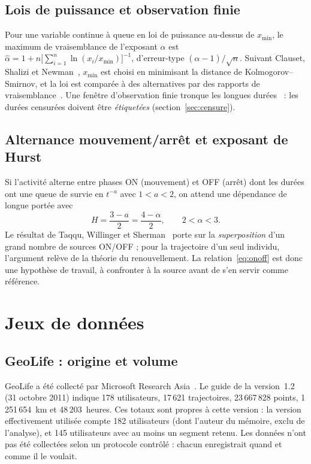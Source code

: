 \documentclass[12pt,a4paper]{report}
\theoremstyle{definition}
\begin{document}
\section{Lois de puissance et observation finie}

Pour une variable continue à queue en loi de puissance au-dessus de $x_{\min}$, le
maximum de vraisemblance de l'exposant $\alpha$ est
$\hat\alpha=1+n\bigl[\sum_{i=1}^n\ln(x_i/x_{\min})\bigr]^{-1}$, d'erreur-type
$(\hat\alpha-1)/\sqrt n$. Suivant Clauset, Shalizi et Newman~\cite{clauset2009}, $x_{\min}$
est choisi en minimisant la distance de Kolmogorov--Smirnov, et la loi est comparée à des
alternatives par des rapports de vraisemblance~\cite{vuong1989}. Une fenêtre d'observation
finie tronque les longues durées~\cite{kivela2015} : les durées censurées doivent être
\emph{étiquetées} (section~\ref{sec:censure}).

\section{Alternance mouvement/arrêt et exposant de Hurst}

Si l'activité alterne entre phases ON (mouvement) et OFF (arrêt) dont les durées ont une
queue de survie en $t^{-a}$ avec $1<a<2$, on attend une dépendance de longue portée avec
\begin{equation}
  H=\frac{3-a}{2}=\frac{4-\alpha}{2},\qquad 2<\alpha<3.
  \label{eq:onoff}
\end{equation}
Le résultat de Taqqu, Willinger et Sherman~\cite{taqqu1997} porte sur la \emph{superposition}
d'un grand nombre de sources ON/OFF ; pour la trajectoire d'un seul individu, l'argument
relève de la théorie du renouvellement. La relation~\eqref{eq:onoff} est donc une hypothèse
de travail, à confronter à la source avant de s'en servir comme référence.

\chapter{Jeux de données}
\label{ch:geolife}

\section{GeoLife : origine et volume}

GeoLife a été collecté par Microsoft Research Asia~\cite{zheng2010,geolifeguide}. Le guide
de la version~1.2 (31 octobre 2011) indique 178 utilisateurs, 17\,621 trajectoires,
23\,667\,828 points, 1\,251\,654~km et 48\,203~heures. Ces totaux sont propres à cette
version : la version effectivement utilisée compte 182 utilisateurs (dont l'auteur du
mémoire, exclu de l'analyse), et 145 utilisateurs avec au moins un segment retenu.
Les données n'ont pas été collectées selon un protocole contrôlé : chacun enregistrait
quand et comme il le voulait.
\end{document}
